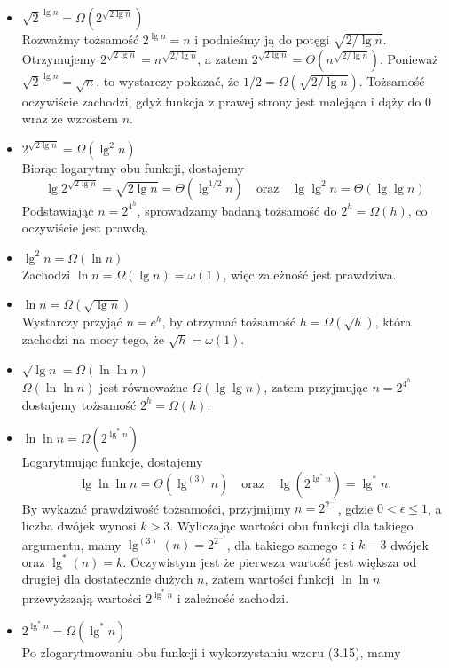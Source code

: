 \begin{itemize}
\item $\sqrt{2}^{\lg n}=\Omega\left(2^{\sqrt{2\lg n}}\right)$ \\
	Rozważmy tożsamość $2^{\lg n}=n$ i podnieśmy ją do potęgi $\sqrt{2/\lg n}$. Otrzymujemy $2^{\sqrt{2\lg n}}=n^{\sqrt{2/\lg n}}$, a zatem $2^{\sqrt{2\lg n}}=\Theta\left(n^{\sqrt{2/\lg n}}\right)$. Ponieważ $\sqrt{2}^{\lg n}=\sqrt{n}$, to wystarczy pokazać, że $1/2=\Omega\left(\sqrt{2/\lg n}\right)$. Tożsamość oczywiście zachodzi, gdyż funkcja z prawej strony jest malejąca i dąży do $0$ wraz ze wzrostem $n$.
\item $2^{\sqrt{2\lg n}}=\Omega\left(\lg^2 n\right)$ \\
	Biorąc logarytmy obu funkcji, dostajemy
	\[
		\lg 2^{\sqrt{2\lg n}} = \sqrt{2\lg n} = \Theta\left(\lg^{1/2}n\right)\quad\mbox{oraz}\quad\lg\lg^2 n = \Theta(\lg\lg n)
	\]
	Podstawiając $n=2^{4^h}$, sprowadzamy badaną tożsamość do $2^h=\Omega(h)$, co oczywiście jest prawdą.
\item $\lg^2 n=\Omega(\ln n)$ \\
	Zachodzi $\ln n=\Omega(\lg n)=\omega(1)$, więc zależność jest prawdziwa.
\item $\ln n=\Omega\left(\sqrt{\lg n}\right)$ \\
	Wystarczy przyjąć $n=e^h$, by otrzymać tożsamość $h=\Omega\left(\sqrt{h}\right)$, która zachodzi na mocy tego, że $\sqrt{h}=\omega(1)$.
\item $\sqrt{\lg n}=\Omega(\ln\ln n)$ \\
	$\Omega(\ln\ln n)$ jest równoważne $\Omega(\lg\lg n)$, zatem przyjmując $n=2^{4^h}$ dostajemy tożsamość $2^h=\Omega(h)$.
\item $\ln\ln n=\Omega\left(2^{\lg^*n}\right)$ \\
	Logarytmując funkcje, dostajemy
	\[
		\lg\ln\ln n = \Theta\left(\lg^{(3)}n\right)\quad\mbox{oraz}\quad\lg\left(2^{\lg^*n}\right) = \lg^*n.
	\]
	By wykazać prawdziwość tożsamości, przyjmijmy $n=2^{2^{\dots^\epsilon}}$, gdzie $0<\epsilon\le 1$, a liczba dwójek wynosi $k>3$. Wyliczając wartości obu funkcji dla takiego argumentu, mamy $\lg^{(3)}(n)=2^{2^{\dots^\epsilon}}$, dla takiego samego $\epsilon$ i $k-3$ dwójek oraz $\lg^*(n)=k$. Oczywistym jest że pierwsza wartość jest większa od drugiej dla dostatecznie dużych $n$, zatem wartości funkcji $\ln\ln n$ przewyższają wartości $2^{\lg^*n}$ i zależność zachodzi.
\item $2^{\lg^*n}=\Omega\left(\lg^*n\right)$ \\
	Po zlogarytmowaniu obu funkcji i wykorzystaniu wzoru (3.15), mamy

\end{itemize}
